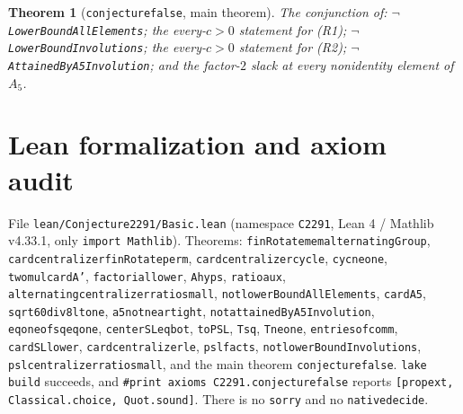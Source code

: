 \documentclass[11pt]{article}
\newtheorem{theorem}{Theorem}
\theoremstyle{definition}
\theoremstyle{remark}
\renewcommand{\_}{\oldus\allowbreak}
\begin{document}
\begin{theorem}[\texttt{conjecture\_2291\_false}, main theorem]
The conjunction of: $\neg$\texttt{LowerBoundAllElements}; the every-$c>0$ statement for (R1);
$\neg$\texttt{LowerBoundInvolutions}; the every-$c>0$ statement for (R2); $\neg$\texttt{AttainedByA5Involution};
and the factor-$2$ slack at every nonidentity element of $A_5$.
\end{theorem}

\section{Lean formalization and axiom audit}

File \texttt{lean/Conjecture2291/Basic.lean} (namespace \texttt{C2291}, Lean 4 / Mathlib v4.33.1, only
\texttt{import Mathlib}). Theorems: \texttt{finRotate\_mem\_alternatingGroup},
\texttt{card\_centralizer\_finRotate\_perm}, \texttt{card\_centralizer\_cyc\_le}, \texttt{cyc\_ne\_one},
\texttt{two\_mul\_card\_A'}, \texttt{factorial\_lower}, \texttt{A\_hyps}, \texttt{ratio\_aux},
\texttt{alternating\_centralizer\_ratio\_small}, \texttt{not\_lowerBoundAllElements}, \texttt{card\_A5},
\texttt{sqrt60\_div8\_lt\_one}, \texttt{a5\_not\_near\_tight}, \texttt{not\_attainedByA5Involution},
\texttt{eq\_one\_of\_sq\_eq\_one}, \texttt{center\_SL\_eq\_bot}, \texttt{toPSL}, \texttt{T\_sq}, \texttt{T\_ne\_one},
\texttt{entries\_of\_comm}, \texttt{card\_SL\_lower}, \texttt{card\_centralizer\_le}, \texttt{psl\_facts},
\texttt{not\_lowerBoundInvolutions}, \texttt{psl\_centralizer\_ratio\_small}, and the main theorem \texttt{conjecture\_2291\_false}. \texttt{lake build} succeeds, and
\texttt{\#print axioms C2291.conjecture\_2291\_false} reports
\texttt{[propext, Classical.choice, Quot.sound]}. There is no \texttt{sorry} and no \texttt{native\_decide}.
\end{document}
